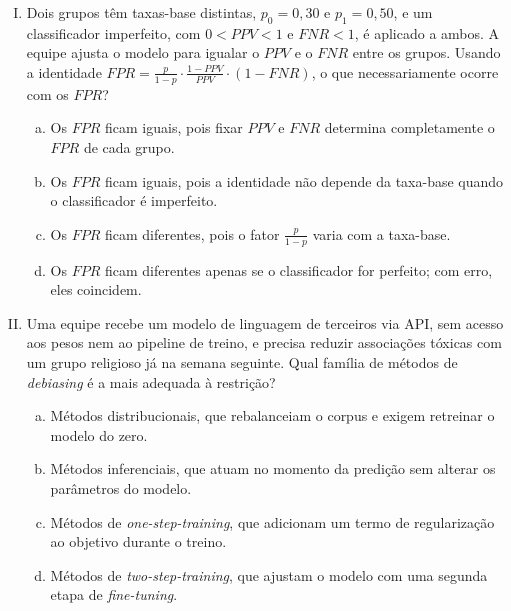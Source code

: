 \documentclass{dlproblemset}
\begin{document}
\begin{enumerate}[I)]
    \item {} Dois grupos têm taxas-base distintas, $p_0 = 0{,}30$ e $p_1 = 0{,}50$, e um classificador imperfeito, com $0 < PPV < 1$ e $FNR < 1$, é aplicado a ambos. A equipe ajusta o modelo para igualar o $PPV$ e o $FNR$ entre os grupos. Usando a identidade $FPR = \frac{p}{1-p} \cdot \frac{1-PPV}{PPV} \cdot (1 - FNR)$, o que necessariamente ocorre com os $FPR$?
    \begin{enumerate}[(a)]
        \item Os $FPR$ ficam iguais, pois fixar $PPV$ e $FNR$ determina completamente o $FPR$ de cada grupo.
        \item Os $FPR$ ficam iguais, pois a identidade não depende da taxa-base quando o classificador é imperfeito.
        \item Os $FPR$ ficam diferentes, pois o fator $\frac{p}{1-p}$ varia com a taxa-base.
        \item Os $FPR$ ficam diferentes apenas se o classificador for perfeito; com erro, eles coincidem.
    \end{enumerate}

    \item Uma equipe recebe um modelo de linguagem de terceiros via API, sem acesso aos pesos nem ao pipeline de treino, e precisa reduzir associações tóxicas com um grupo religioso já na semana seguinte. Qual família de métodos de \textit{debiasing} é a mais adequada à restrição?
    \begin{enumerate}[(a)]
        \item Métodos distribucionais, que rebalanceiam o corpus e exigem retreinar o modelo do zero.
        \item Métodos inferenciais, que atuam no momento da predição sem alterar os parâmetros do modelo.
        \item Métodos de \textit{one-step-training}, que adicionam um termo de regularização ao objetivo durante o treino.
        \item Métodos de \textit{two-step-training}, que ajustam o modelo com uma segunda etapa de \textit{fine-tuning}.
    \end{enumerate}


\end{enumerate}
\end{document}
